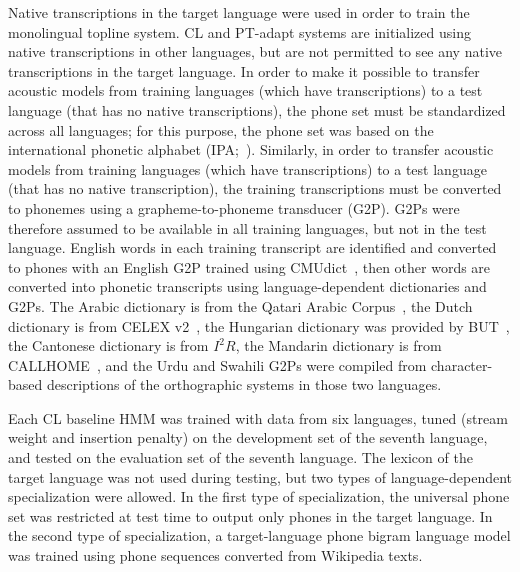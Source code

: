 {\color{blue} Native transcriptions in the target language were used
  in order to train the {\sc monolingual} topline system.  {\sc CL}
  and {\sc PT-adapt} systems are initialized using native
  transcriptions in other languages, but are not permitted to see any
  native transcriptions in the target language.  In order to make it
  possible to transfer acoustic models from training languages (which
  have transcriptions) to a test language (that has no native
  transcriptions), the phone set must be standardized across all
  languages; for this purpose, the phone set was based on the
  international phonetic alphabet (IPA;~\cite{ipa1993}).  Similarly,
  in order to transfer acoustic models from training languages
  (which have transcriptions) to a test language (that has no
  native transcription), the training transcriptions must be
  converted to phonemes using a grapheme-to-phoneme transducer (G2P).
  G2Ps were therefore assumed to be available in all training languages,
  but not in the test language.}
  English words in each {\color{blue} training} transcript are identified and
converted to phones with an English G2P trained using
CMUdict~\cite{Lenzo1995}, then other words are converted into phonetic
transcripts using language-dependent dictionaries and G2Ps.
The Arabic dictionary is from the Qatari Arabic Corpus~\cite{Elmahdy14},
the Dutch dictionary is from CELEX v2~\cite{Baayen96},
the Hungarian dictionary was provided by BUT~\cite{Grezl14},
the Cantonese dictionary is from $I^2R$,
the Mandarin dictionary is from CALLHOME~\cite{LDC96},
and the Urdu and Swahili G2Ps were compiled from
character-based descriptions of the orthographic systems in those
two languages. 

Each {\color{blue} {\sc CL} baseline}
HMM was trained with data from six languages, tuned
(stream weight and insertion penalty)
on the development set of the seventh language, and
tested on the evaluation set of the seventh language.  The lexicon of
the target language was not used during testing, but two types of
language-dependent specialization were allowed.  In the first type of
specialization, the universal phone set was restricted at test time to
output only phones in the target language.  In the second type of
specialization, a target-language phone bigram language model was
trained using phone sequences converted from Wikipedia texts.


